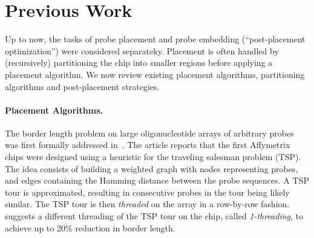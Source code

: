 \documentclass{llncs}
\newcommand{\ignore}[1]{}
\begin{document}
\section{Previous Work}
\label{sec:previous_work}

Up to now, the tasks of probe placement and probe embedding (``post-placement
optimization'') were considered separateky. Placement is often handled by
(recursively) partitioning the chip into smaller regions before applying a
placement algorithm. We now review existing placement algorithms, partitioning
algorithms and post-placement strategies.

\paragraph{Placement Algorithms.}
The border length problem on large oligonucleotide arrays of arbitrary probes
was first formally addressed in~\cite{HANNENHALLI02}. The article reports that
the first Affymetrix chips were designed using a heuristic for the traveling
salesman problem (TSP). The idea consists of building a weighted graph with
nodes representing probes, and edges containing the Hamming distance between
the probe sequences. A TSP tour is approximated, resulting in consecutive
probes in the tour being likely similar. The TSP tour is then
\emph{threaded} on the array in a row-by-row fashion.  \cite{HANNENHALLI02}
suggests a different threading of the TSP tour on the chip, called
\emph{1-threading}, to achieve up to 20\% reduction in border length.

\ignore{ Kahng~{\it et~al}.~\cite{KAHNG02} propose the \emph{Epitaxial}
  placement algorithm that places a random probe in the center of the array
  and continues to insert probes in spots adjacent to already filled spots,
  employing a greedy heuristic to select the next spot to be filled and the
  probe that is assigned to it. Priority is given to spots whose neighbors are
  already filled, in which case the algorithm places the probe with minimum
  sum of Hamming distances to its neighbors. If no such a spot exists, the
  algorithm examines all non-filled spots~$s_i$ with $n_i \geq 1$ filled
  neighbors and finds a non-assigned probe $p_j$ with minimum sum of Hamming
  distances to the neighboring probes $H_{ij}$. For each possible assignment
  of $p_j$ to $s_i$, it computes a cost $c(s_i,p_j) := k_{n_i} H_{ij} / n$,
  where $k_{n_i}$ are scaling coefficients ($k_1 = 1$, $k_2 = 0.8$, and $k_3 =
  0.6$), and makes the assignment with minimum cost. With this algorithm, they
  claimed to achieve up to 10\% reduction in border conflicts over the
  TSP-based approach of Hannenhalli~{\it et~al}.\ \cite{HANNENHALLI02}.
%  
}
\end{document}

